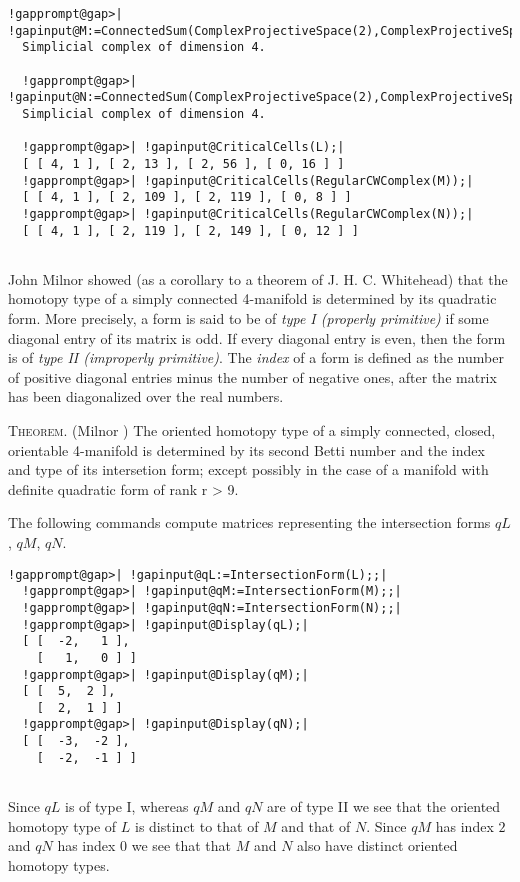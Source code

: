 \documentclass[a4paper,11pt]{report}
\begin{document}
{{\begin{Verbatim}[commandchars=!@|,fontsize=\small,frame=single,label=Example]
  !gapprompt@gap>| !gapinput@M:=ConnectedSum(ComplexProjectiveSpace(2),ComplexProjectiveSpace(2),-1);|
  Simplicial complex of dimension 4.
  
  !gapprompt@gap>| !gapinput@N:=ConnectedSum(ComplexProjectiveSpace(2),ComplexProjectiveSpace(2),+1);|
  Simplicial complex of dimension 4.
  
  !gapprompt@gap>| !gapinput@CriticalCells(L);|
  [ [ 4, 1 ], [ 2, 13 ], [ 2, 56 ], [ 0, 16 ] ]
  !gapprompt@gap>| !gapinput@CriticalCells(RegularCWComplex(M));|
  [ [ 4, 1 ], [ 2, 109 ], [ 2, 119 ], [ 0, 8 ] ]
  !gapprompt@gap>| !gapinput@CriticalCells(RegularCWComplex(N));|
  [ [ 4, 1 ], [ 2, 119 ], [ 2, 149 ], [ 0, 12 ] ]
  
\end{Verbatim}
 John Milnor showed (as a corollary to a theorem of J. H. C. Whitehead) that
the homotopy type of a simply connected 4-manifold is determined by its
quadratic form. More precisely, a form is said to be of \emph{type I (properly primitive)} if some diagonal entry of its matrix is odd. If every diagonal entry is even,
then the form is of \emph{type II (improperly primitive)}. The \emph{index} of a form is defined as the number of positive diagonal entries minus the
number of negative ones, after the matrix has been diagonalized over the real
numbers. 

\textsc{Theorem.} (Milnor \cite{milnor}) The oriented homotopy type of a simply connected, closed, orientable
4-manifold is determined by its second Betti number and the index and type of
its intersetion form; except possibly in the case of a manifold with definite
quadratic form of rank r {\textgreater} 9. 

 The following commands compute matrices representing the intersection forms $qL$, $qM$, $qN$. 
\begin{Verbatim}[commandchars=!@|,fontsize=\small,frame=single,label=Example]
  !gapprompt@gap>| !gapinput@qL:=IntersectionForm(L);;|
  !gapprompt@gap>| !gapinput@qM:=IntersectionForm(M);;|
  !gapprompt@gap>| !gapinput@qN:=IntersectionForm(N);;|
  !gapprompt@gap>| !gapinput@Display(qL);|
  [ [  -2,   1 ],
    [   1,   0 ] ]
  !gapprompt@gap>| !gapinput@Display(qM);|
  [ [  5,  2 ],
    [  2,  1 ] ]
  !gapprompt@gap>| !gapinput@Display(qN);|
  [ [  -3,  -2 ],
    [  -2,  -1 ] ]
  
\end{Verbatim}
 Since $qL$ is of type I, whereas $qM$ and $qN$ are of type II we see that the oriented homotopy type of $L$ is distinct to that of $M$ and that of $N$. Since $qM$ has index $2$ and $qN$ has index $0$ we see that that $M$ and $N$ also have distinct oriented homotopy types. }

}
\end{document}
